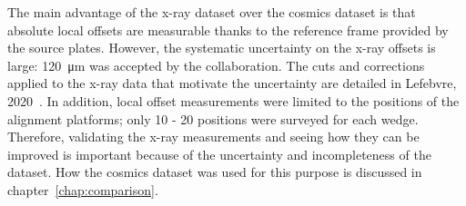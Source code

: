 The main advantage of the x-ray dataset over the cosmics dataset is that absolute local offsets are measurable thanks to the reference frame provided by the source plates. However, the systematic uncertainty on the x-ray offsets is large: \SI{120}{\micro\meter} was accepted by the collaboration. The cuts and corrections applied to the x-ray data that motivate the uncertainty are detailed in Lefebvre, 2020~\cite{lefebvre_precision_2020}. In addition, local offset measurements were limited to the positions of the alignment platforms; only 10 - 20 positions were surveyed for each wedge. Therefore, validating the x-ray measurements and seeing how they can be improved is important because of the uncertainty and incompleteness of the dataset. How the cosmics dataset was used for this purpose is discussed in chapter~\ref{chap:comparison}. 
